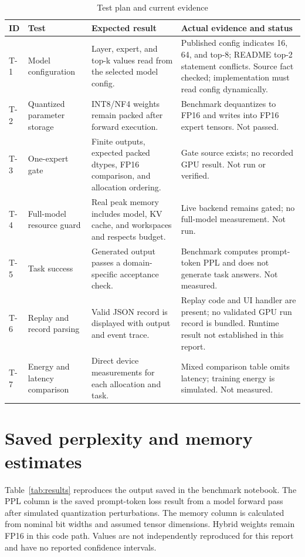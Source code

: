 \documentclass[12pt,a4paper]{report}
\begin{document}
\begin{table}[ht]
\centering
\footnotesize
\caption{Test plan and current evidence}
\label{tab:tests}
\begin{tabularx}{\linewidth}{@{}L{1.0cm}L{3.0cm}Y Y@{}}
\toprule
ID & Test & Expected result & Actual evidence and status\\
\midrule
T-1 & Model configuration & Layer, expert, and top-k values read from the selected model config. & Published config indicates 16, 64, and top-8; README top-2 statement conflicts. Source fact checked; implementation must read config dynamically.\\
T-2 & Quantized parameter storage & INT8/NF4 weights remain packed after forward execution. & Benchmark dequantizes to FP16 and writes into FP16 expert tensors. Not passed.\\
T-3 & One-expert gate & Finite outputs, expected packed dtypes, FP16 comparison, and allocation ordering. & Gate source exists; no recorded GPU result. Not run or verified.\\
T-4 & Full-model resource guard & Real peak memory includes model, KV cache, and workspaces and respects budget. & Live backend remains gated; no full-model measurement. Not run.\\
T-5 & Task success & Generated output passes a domain-specific acceptance check. & Benchmark computes prompt-token PPL and does not generate task answers. Not measured.\\
T-6 & Replay and record parsing & Valid JSON record is displayed with output and event trace. & Replay code and UI handler are present; no validated GPU run record is bundled. Runtime result not established in this report.\\
T-7 & Energy and latency comparison & Direct device measurements for each allocation and task. & Mixed comparison table omits latency; training energy is simulated. Not measured.\\
\bottomrule
\end{tabularx}
\end{table}

\section{Saved perplexity and memory estimates}
Table~\ref{tab:results} reproduces the output saved in the benchmark notebook. The PPL column is the saved prompt-token loss result from a model forward pass after simulated quantization perturbations. The memory column is calculated from nominal bit widths and assumed tensor dimensions. Hybrid weights remain FP16 in this code path. Values are not independently reproduced for this report and have no reported confidence intervals.
\end{document}
